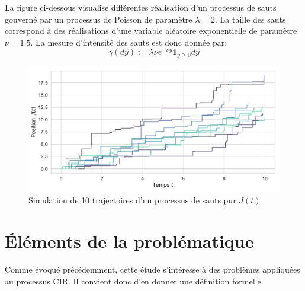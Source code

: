 La figure ci-dessous visualise différentes réalisation d'un processus de sauts gouverné par un processus de Poisson de paramètre $\lambda=2$. La taille des sauts correspond à des réalisations d'une variable aléatoire exponentielle de paramètre $\nu=1.5$. La mesure d'intensité des sauts est donc donnée par:
\[
\gamma(dy):=\lambda\nu e^{-\nu y}\mathds{1}_{y\geq0}dy
\]
\begin{figure}[htb]
    \centering
    \includegraphics[width=0.9\linewidth]{img/intro/path_jump.pdf}
    \caption{Simulation de 10 trajectoires d'un processus de sauts pur $J(t)$}\label{fig:TrajJump}
\end{figure}
\FloatBarrier\clearpage

\section{Éléments de la problématique}  %

Comme évoqué précédemment, cette étude s'intéresse à des problèmes appliquées au processus \acl{CIR}. Il convient donc d'en donner une définition formelle.
